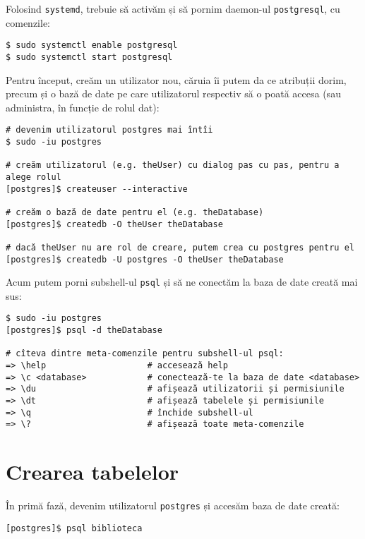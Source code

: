 Folosind \texttt{systemd}, trebuie să activăm și să pornim daemon-ul \texttt{postgresql},
cu comenzile:
{
  \small
\begin{verbatim}
$ sudo systemctl enable postgresql
$ sudo systemctl start postgresql
\end{verbatim}
}

Pentru început, creăm un utilizator nou, căruia îi putem da ce atribuții dorim,
precum și o bază de date pe care utilizatorul respectiv să o poată accesa (sau
administra, în funcție de rolul dat):
{
  \small
\begin{verbatim}
# devenim utilizatorul postgres mai întîi
$ sudo -iu postgres

# creăm utilizatorul (e.g. theUser) cu dialog pas cu pas, pentru a alege rolul
[postgres]$ createuser --interactive

# creăm o bază de date pentru el (e.g. theDatabase)
[postgres]$ createdb -O theUser theDatabase

# dacă theUser nu are rol de creare, putem crea cu postgres pentru el
[postgres]$ createdb -U postgres -O theUser theDatabase
\end{verbatim}
}

Acum putem porni subshell-ul \texttt{psql} și să ne conectăm la baza de date
creată mai sus:
{
  \small
\begin{verbatim}
$ sudo -iu postgres
[postgres]$ psql -d theDatabase

# cîteva dintre meta-comenzile pentru subshell-ul psql:
=> \help                    # accesează help
=> \c <database>            # conectează-te la baza de date <database>
=> \du                      # afișează utilizatorii și permisiunile
=> \dt                      # afișează tabelele și permisiunile
=> \q                       # închide subshell-ul
=> \?                       # afișează toate meta-comenzile
\end{verbatim}
}


\section{Crearea tabelelor}

În primă fază, devenim utilizatorul \texttt{postgres} și accesăm baza
de date creată:
\begin{verbatim}
[postgres]$ psql biblioteca
\end{verbatim}

